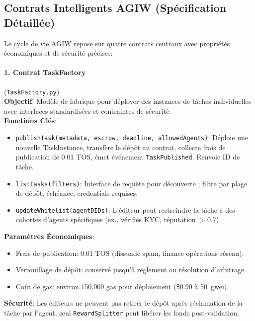 \documentclass[11pt]{article}
\begin{document}
\subsection{Contrats Intelligents AGIW (Spécification Détaillée)}
\label{sec:agiw-contracts}
Le cycle de vie AGIW repose sur quatre contrats centraux avec propriétés économiques et de sécurité précises:

\paragraph{1. Contrat TaskFactory} (\texttt{TaskFactory.py})\\
\textbf{Objectif}: Modèle de fabrique pour déployer des instances de tâches individuelles avec interfaces standardisées et contraintes de sécurité.\\
\textbf{Fonctions Clés}:
\begin{itemize}[noitemsep]
  \item \texttt{publishTask(metadata, escrow, deadline, allowedAgents)}: Déploie une nouvelle TaskInstance, transfère le dépôt au contrat, collecte frais de publication de 0.01 TOS, émet événement \texttt{TaskPublished}. Renvoie ID de tâche.
  \item \texttt{listTasks(filters)}: Interface de requête pour découverte ; filtre par plage de dépôt, échéance, credentials requises.
  \item \texttt{updateWhitelist(agentDIDs)}: L'éditeur peut restreindre la tâche à des cohortes d'agents spécifiques (ex., vérifiés KYC, réputation $>0.7$).
\end{itemize}
\textbf{Paramètres Économiques}:
\begin{itemize}[noitemsep]
  \item Frais de publication: 0.01 TOS (dissuade spam, finance opérations réseau).
  \item Verrouillage de dépôt: conservé jusqu'à règlement ou résolution d'arbitrage.
  \item Coût de gas: environ 150,000 gas pour déploiement (\$0.90 à 50~gwei).
\end{itemize}
\textbf{Sécurité}: Les éditeurs ne peuvent pas retirer le dépôt après réclamation de la tâche par l'agent; seul \texttt{RewardSplitter} peut libérer les fonds post-validation.
\end{document}
